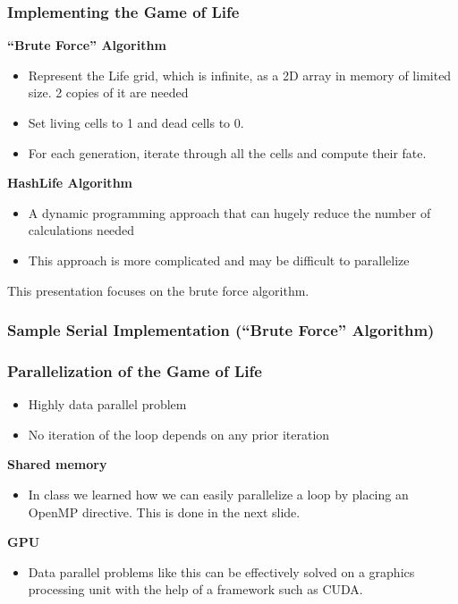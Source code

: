 \documentclass{beamer}
\begin{document}
\begin{frame}
	\frametitle{Implementing the Game of Life}
	{\bf ``Brute Force'' Algorithm}
	\begin{itemize}
		\item Represent the Life grid, which is infinite, as a 2D array in
		memory of limited size.  2 copies of it are needed
		\item Set living cells to 1 and dead cells to 0.
		\item For each generation, iterate through all the cells and compute
		their fate. 
	\end{itemize}
	
	{\bf HashLife Algorithm}
	\begin{itemize}
		\item A dynamic programming approach that can hugely reduce the
		number of calculations needed
		\item This approach is more complicated and may be difficult to
		parallelize
	\end{itemize}
	This presentation focuses on the brute force algorithm.
\end{frame}

\begin{frame}
	\frametitle{Sample Serial Implementation (``Brute Force'' Algorithm)}
	
\end{frame}

\begin{frame}
	\frametitle{Parallelization of the Game of Life}
	\begin{itemize}
		\item Highly data parallel problem
		\item No iteration of the loop depends on any prior iteration
	\end{itemize}
	\begin{center}
	{\bf Shared memory}
	\end{center}
	\begin{itemize}
		\item In class we learned how we can easily parallelize a loop by
		placing an OpenMP directive.  This is done in the next slide.
	\end{itemize}
	\begin{center}
	{\bf GPU}
	\end{center}
	\begin{itemize}
		\item Data parallel problems like this can be effectively solved
		on a graphics processing unit with the help of a framework such as
		CUDA.
	\end{itemize}
\end{frame}
\end{document}
